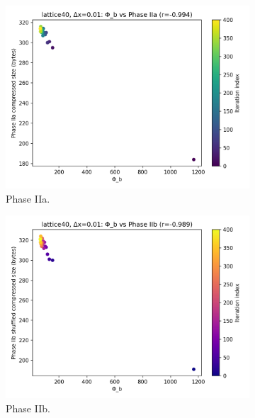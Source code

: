 \documentclass[11pt,a4paper]{article}
\numberwithin{equation}{section}
\begin{document}
\begin{figure}[h!]
\centering
\begin{subfigure}[b]{0.32\textwidth}
\includegraphics[width=\textwidth]{figures/lattice40_dx0.01_phib_vs_phase2a.png}
\caption{Phase IIa.}
\end{subfigure}\hfill
\begin{subfigure}[b]{0.32\textwidth}
\includegraphics[width=\textwidth]{figures/lattice40_dx0.01_phib_vs_phase2b.png}
\caption{Phase IIb.}
\end{subfigure}\hfill
\begin{subfigure}[b]{0.32\textwidth}

\end{subfigure}
\end{figure}
\end{document}
